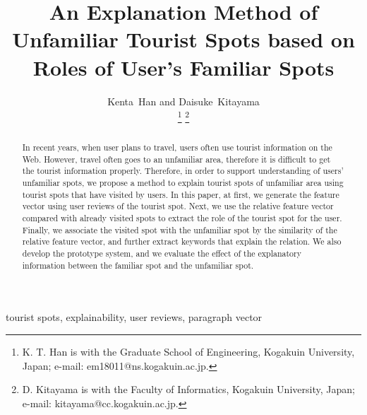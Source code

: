\documentclass[journal]{IAENGtran}
\begin{document}
\title{An Explanation Method of Unfamiliar Tourist Spots based on Roles of User's Familiar Spots}
\author{Kenta~Han and Daisuke~Kitayama

\thanks{K. T. Han is with the Graduate School of Engineering, Kogakuin University, Japan; e-mail: em18011@ns.kogakuin.ac.jp.}%
\thanks{D. Kitayama is with the Faculty of Informatics, Kogakuin University, Japan;  e-mail: kitayama@cc.kogakuin.ac.jp.}}%
\maketitle

\pagestyle{empty}
\thispagestyle{empty}

\begin{abstract}
In recent years, when user plans to travel, users often use tourist information on the Web.
However, travel often goes to an unfamiliar area, therefore it is difficult to get the tourist information properly.
Therefore, in order to support understanding of users' unfamiliar spots, we propose a method to explain tourist spots of unfamiliar area using tourist spots that have visited by users.
In this paper, at first, we generate the feature vector using user reviews of the tourist spot.
Next, we use the relative feature vector compared with already visited spots to extract the role of the tourist spot for the user.
Finally, we associate the visited spot with the unfamiliar spot by the similarity of the relative feature vector, and further extract keywords that explain the relation.
We also develop the prototype system, and we evaluate the effect of the explanatory information between the familiar spot and the unfamiliar spot.
\end{abstract}

\begin{IAENGkeywords}
tourist spots, explainability, user reviews, paragraph vector
\end{IAENGkeywords}

\IAENGpeerreviewmaketitle
\end{document}
